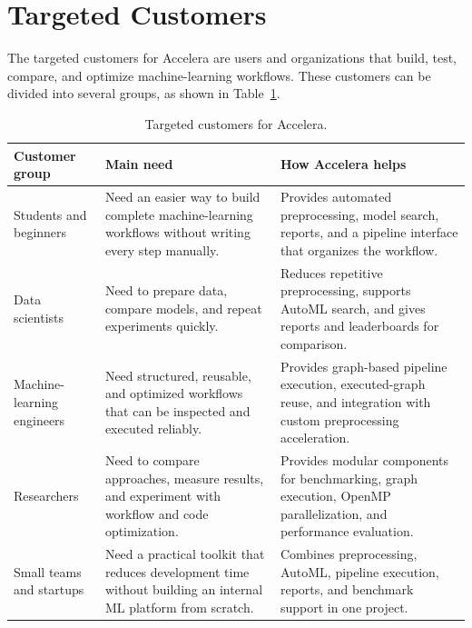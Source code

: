 \documentclass[12pt,a4paper]{report}
\begin{document}
\section{Targeted Customers}

The targeted customers for Accelera are users and organizations that build,
test, compare, and optimize machine-learning workflows. These customers can be
divided into several groups, as shown in Table~\ref{tab:target-customers}.

\begin{table}[!htbp]
\centering
\caption{Targeted customers for Accelera.}
\label{tab:target-customers}
\small
\renewcommand{\arraystretch}{1.18}
\setlength{\tabcolsep}{4pt}
\begin{tabular}{p{}p{}p{}}
\toprule
Customer group & Main need & How Accelera helps \\
\midrule
Students and beginners &
Need an easier way to build complete machine-learning workflows without writing
every step manually. &
Provides automated preprocessing, model search, reports, and a pipeline
interface that organizes the workflow. \\

Data scientists &
Need to prepare data, compare models, and repeat experiments quickly. &
Reduces repetitive preprocessing, supports AutoML search, and gives reports and
leaderboards for comparison. \\

Machine-learning engineers &
Need structured, reusable, and optimized workflows that can be inspected and
executed reliably. &
Provides graph-based pipeline execution, executed-graph reuse, and integration
with custom preprocessing acceleration. \\

Researchers &
Need to compare approaches, measure results, and experiment with workflow and
code optimization. &
Provides modular components for benchmarking, graph execution, OpenMP
parallelization, and performance evaluation. \\

Small teams and startups &
Need a practical toolkit that reduces development time without building an
internal ML platform from scratch. &
Combines preprocessing, AutoML, pipeline execution, reports, and benchmark
support in one project. \\
\bottomrule
\end{tabular}
\renewcommand{\arraystretch}{1.0}
\end{table}
\end{document}
